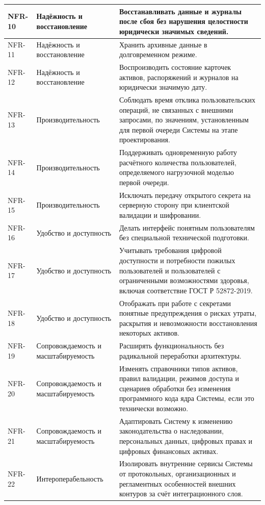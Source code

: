 \begin{longtable}{|P{1.45cm}|P{3.35cm}|P{10.7cm}|}
NFR-10 & Надёжность и восстановление & Восстанавливать данные и журналы после сбоя без нарушения целостности юридически значимых сведений.\\ \hline
NFR-11 & Надёжность и восстановление & Хранить архивные данные в долговременном режиме.\\ \hline
NFR-12 & Надёжность и восстановление & Воспроизводить состояние карточек активов, распоряжений и журналов на юридически значимую дату.\\ \hline
NFR-13 & Производительность & Соблюдать время отклика пользовательских операций, не связанных с внешними запросами, по значениям, установленным для первой очереди Системы на этапе проектирования.\\ \hline
NFR-14 & Производительность & Поддерживать одновременную работу расчётного количества пользователей, определяемого нагрузочной моделью первой очереди.\\ \hline
NFR-15 & Производительность & Исключать передачу открытого секрета на серверную сторону при клиентской валидации и шифровании.\\ \hline
NFR-16 & Удобство и доступность & Делать интерфейс понятным пользователям без специальной технической подготовки.\\ \hline
NFR-17 & Удобство и доступность & Учитывать требования цифровой доступности и потребности пожилых пользователей и пользователей с ограниченными возможностями здоровья, включая соответствие ГОСТ Р 52872-2019.\\ \hline
NFR-18 & Удобство и доступность & Отображать при работе с секретами понятные предупреждения о рисках утраты, раскрытия и невозможности восстановления некоторых активов.\\ \hline
NFR-19 & Сопровождаемость и масштабируемость & Расширять функциональность без радикальной переработки архитектуры.\\ \hline
NFR-20 & Сопровождаемость и масштабируемость & Изменять справочники типов активов, правил валидации, режимов доступа и сценариев обработки без изменения программного кода ядра Системы, если это технически возможно.\\ \hline
NFR-21 & Сопровождаемость и масштабируемость & Адаптировать Систему к изменению законодательства о наследовании, персональных данных, цифровых правах и цифровых финансовых активах.\\ \hline
NFR-22 & Интер\-операбельность & Изолировать внутренние сервисы Системы от протокольных, организационных и регламентных особенностей внешних контуров за счёт интеграционного слоя.\\ \hline

\end{longtable}
